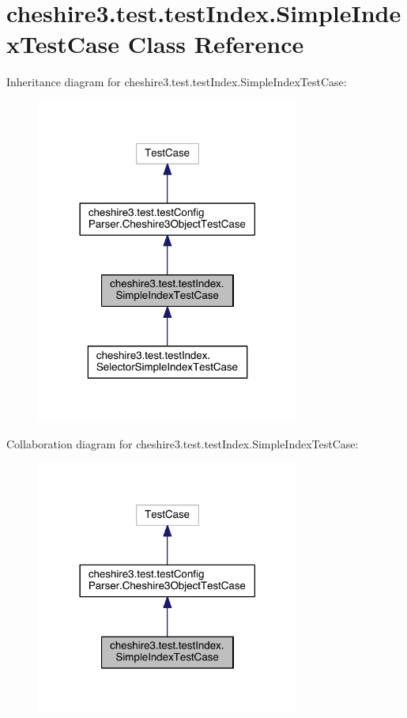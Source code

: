 \hypertarget{classcheshire3_1_1test_1_1test_index_1_1_simple_index_test_case}{\section{cheshire3.\-test.\-test\-Index.\-Simple\-Index\-Test\-Case Class Reference}
\label{classcheshire3_1_1test_1_1test_index_1_1_simple_index_test_case}
}


Inheritance diagram for cheshire3.\-test.\-test\-Index.\-Simple\-Index\-Test\-Case\-:
\nopagebreak
\begin{figure}[H]
\begin{center}
\leavevmode
\includegraphics[width=246pt]{classcheshire3_1_1test_1_1test_index_1_1_simple_index_test_case__inherit__graph}
\end{center}
\end{figure}


Collaboration diagram for cheshire3.\-test.\-test\-Index.\-Simple\-Index\-Test\-Case\-:
\nopagebreak
\begin{figure}[H]
\begin{center}
\leavevmode
\includegraphics[width=246pt]{classcheshire3_1_1test_1_1test_index_1_1_simple_index_test_case__coll__graph}
\end{center}
\end{figure}
